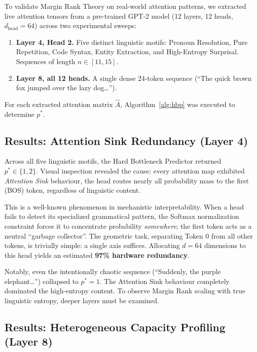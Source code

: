 To validate Margin Rank Theory on real-world attention patterns, we extracted live attention
tensors from a pre-trained GPT-2 model (12 layers, 12 heads, $d_{\text{head}} = 64$) across
two experimental sweeps:
\begin{enumerate}
  \item \textbf{Layer 4, Head 2.} Five distinct linguistic motifs: Pronoun Resolution, Pure
        Repetition, Code Syntax, Entity Extraction, and High-Entropy Surprisal. Sequences of
        length $n \in [11, 15]$.
  \item \textbf{Layer 8, all 12 heads.} A single dense 24-token sequence (``The quick brown
        fox jumped over the lazy dog\ldots'').
\end{enumerate}
For each extracted attention matrix $\hat{A}$, Algorithm~\ref{alg:hbp} was executed to
determine $p^*$.

\subsection{Results: Attention Sink Redundancy (Layer 4)}

Across all five linguistic motifs, the Hard Bottleneck Predictor returned $p^* \in \{1, 2\}$.
Visual inspection revealed the cause: every attention map exhibited \emph{Attention Sink}
behaviour, the head routes nearly all probability mass to the first (BOS) token, regardless
of linguistic content.

This is a well-known phenomenon in mechanistic interpretability. When a head fails to detect
its specialized grammatical pattern, the Softmax normalization constraint forces it to
concentrate probability \emph{somewhere}; the first token acts as a neutral ``garbage
collector''. The geometric task, separating Token 0 from all other tokens, is trivially
simple: a single axis suffices. Allocating $d = 64$ dimensions to this head yields an
estimated \textbf{97\% hardware redundancy}.

Notably, even the intentionally chaotic sequence (``Suddenly, the purple
elephant\ldots'') collapsed to $p^*=1$. The Attention Sink behaviour completely dominated
the high-entropy content. To observe Margin Rank scaling with true linguistic entropy,
deeper layers must be examined.

\subsection{Results: Heterogeneous Capacity Profiling (Layer 8)}

